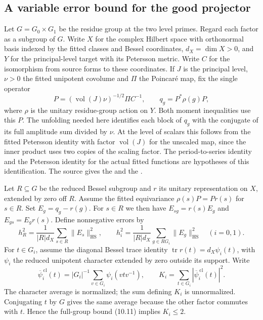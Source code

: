 \subsection{A variable error bound for the good projector}

Let $G=G_0\times G_1$ be the residue group at the two level primes. Regard
each factor as a subgroup of $G$. Write $X$ for the complex Hilbert space
with orthonormal basis indexed by the fitted classes and Bessel coordinates,
$d_X=\dim X>0$, and $Y$ for the principal-level target with its Petersson
metric. Write $C$ for the isomorphism from source forms to these coordinates.
If $J$ is the principal level, $\nu>0$ the fitted unipotent covolume and
$\Pi$ the Poincar\'e map, fix the single operator
\[
       P=(\operatorname{vol}(J)\nu)^{-1/2}\Pi C^{-1},\qquad
       q_g=P^*\rho(g)P ,
\]
where $\rho$ is the unitary residue-group action on $Y$. Both moment
inequalities use this $P$. The unfolding needed here identifies each block
of $q_g$ with the conjugate of its full amplitude sum divided by $\nu$.
At the level of scalars this follows from the fitted Petersson identity
with factor $\operatorname{vol}(J)$ for the unscaled map, since the inner
product uses two copies of the scaling factor. The period-to-series identity
and the Petersson identity for the actual fitted functions are hypotheses
of this identification. The source gives the
 and
the .

Let $R\subseteq G$ be the reduced Bessel subgroup and $r$ its unitary
representation on $X$, extended by zero off $R$. Assume the fitted
equivariance $\rho(s)P=Pr(s)$ for $s\in R$. Set $E_g=q_g-r(g)$.
For $s\in R$ we then have
$E_{sg}=r(s)E_g$ and $E_{gs}=E_g r(s)$. Define nonnegative errors by
\[
 h_R^2=\frac{1}{|R|d_X}\sum_{s\in R}\|E_s\|_{\mathrm{HS}}^2,\qquad
 h_i^2=\frac{1}{|R|d_X}\sum_{g\in R G_i}\|E_g\|_{\mathrm{HS}}^2
 \quad (i=0,1).
\]
For $t\in G_i$, assume the diagonal Bessel trace identity
$\operatorname{tr}r(t)=d_X\psi_i(t)$, with $\psi_i$ the reduced
unipotent character extended by zero outside its support. Write
\[
  \overline\psi_i^{\,\mathrm{cl}}(t)
     = |G_i|^{-1}\sum_{v\in G_i}\psi_i(vtv^{-1}),\qquad
  K_i=\sum_{t\in G_i}|\overline\psi_i^{\,\mathrm{cl}}(t)|^2 .
\]
The character average is normalized; the sum defining $K_i$ is unnormalized.
Conjugating $t$ by $G$ gives the same average because the other factor
commutes with $t$. Hence the full-group bound (10.11) implies $K_i\le2$.

